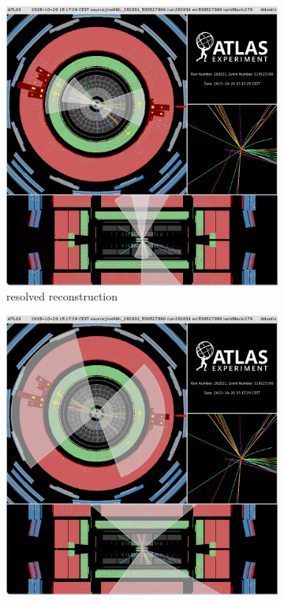 \begin{figure}[htbp!]
\centering
\captionsetup{justification=centering}
    \begin{subfigure}[b]{0.45\textwidth}
        \includegraphics[width=\textwidth]{figures/object/JiveXML_282631_530527390-YX-RZ-YZ-EventInfo-2016-02-29-15-48-39}
        \caption{resolved reconstruction}
        \label{fig:obj_evt_display_resolved}
    \end{subfigure}
    \quad
    \begin{subfigure}[b]{0.45\textwidth}
        \includegraphics[width=\textwidth]{figures/object/JiveXML_282631_530527390-YX-RZ-YZ-EventInfo-2016-02-29-15-48-08}

\end{subfigure}
\end{figure}
